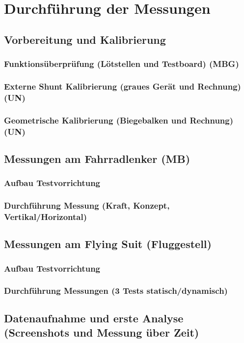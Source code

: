 \chapter{Durchf\"uhrung der Messungen}

\section{Vorbereitung und Kalibrierung}
\subsection{Funktions\"uberpr\"ufung (L\"otstellen und Testboard) (MBG)}
\subsection{Externe Shunt Kalibrierung (graues Ger\"at und Rechnung) (UN)}
\subsection{Geometrische Kalibrierung (Biegebalken und Rechnung) (UN)}

\section{Messungen am Fahrradlenker (MB)}
\subsection{Aufbau Testvorrichtung}
\subsection{Durchf\"uhrung Messung (Kraft, Konzept, Vertikal/Horizontal)}

\section{Messungen am Flying Suit (Fluggestell)}
\subsection{Aufbau Testvorrichtung}
\subsection{Durchf\"uhrung Messungen (3 Tests statisch/dynamisch)}

\section{Datenaufnahme und erste Analyse (Screenshots und Messung \"uber Zeit)}
